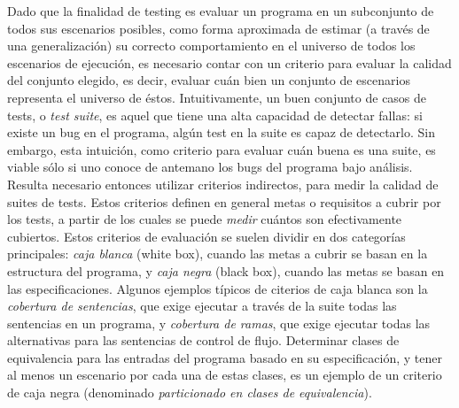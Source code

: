 Dado que la finalidad de testing es evaluar un programa en un subconjunto de todos sus escenarios posibles, como forma aproximada de estimar (a trav\'es de una generalizaci\'on) su correcto comportamiento en el universo de todos los escenarios de ejecuci\'on, es necesario contar con un criterio para evaluar la calidad del conjunto elegido, es decir, evaluar cu\'an bien un conjunto de escenarios representa el universo de \'estos. Intuitivamente, un buen conjunto de casos de tests, o \emph{test suite}, es aquel que tiene una alta capacidad de detectar fallas: si existe un bug en el programa, alg\'un test en la suite es capaz de detectarlo. Sin embargo, esta intuici\'on, como criterio para evaluar cu\'an buena es una suite, es viable s\'olo si uno conoce de antemano los bugs del programa bajo an\'alisis. 
Resulta necesario entonces utilizar criterios indirectos, para medir la calidad de suites de tests. Estos criterios definen en general metas o requisitos a cubrir por los tests, a partir de los cuales se puede \emph{medir} cu\'antos son efectivamente cubiertos. Estos criterios de evaluaci\'on se suelen dividir en dos categor\'ias principales: \emph{caja blanca} (white box), cuando las metas a cubrir se basan en la estructura del programa, y \emph{caja negra} (black box), cuando las metas se basan en las especificaciones. Algunos ejemplos t\'ipicos de citerios de caja blanca son la \emph{cobertura de sentencias}, que exige ejecutar a trav\'es de la suite todas las sentencias en un programa, y \emph{cobertura de ramas}, que exige ejecutar todas las alternativas para las sentencias de control de flujo. Determinar clases de equivalencia para las entradas del programa basado en su especificaci\'on, y tener al menos un escenario por cada una de estas clases, es un ejemplo de un criterio de caja negra (denominado \emph{particionado en clases de equivalencia}).

